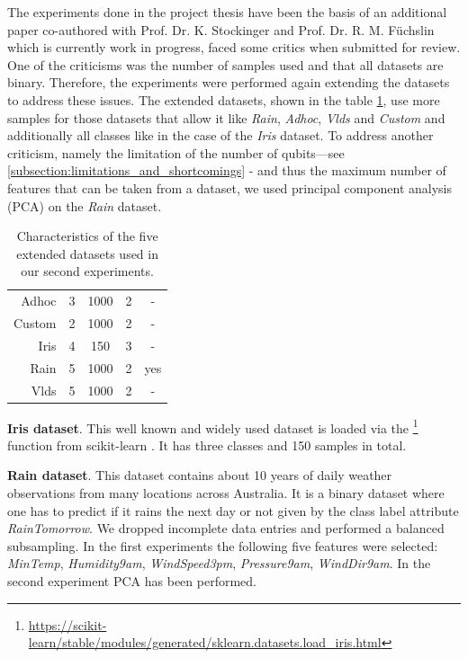 The experiments done in the project thesis have been the basis of an additional paper co-authored with Prof. Dr. K. Stockinger and Prof. Dr. R. M. Füchslin which is currently work in progress, faced some critics when submitted for review. 
One of the criticisms was the number of samples used and that all datasets are binary. Therefore, the experiments were performed again extending the datasets to address these issues. The extended datasets, shown in the table \ref{table:qnn_extended_datasets}, use more samples for those datasets that allow it like \textit{Rain}, \textit{Adhoc}, \textit{Vlds} and \textit{Custom} and additionally all classes like in the case of the \textit{Iris} dataset. To address another criticism, namely the limitation of the number of qubits—see \ref{subsection:limitations_and_shortcomings} - and thus the maximum number of features that can be taken from a dataset, we used principal component analysis (PCA) on the \textit{Rain} dataset.

\begin{table}[!h]
	\centering
	\begin{tabular}{rcccc}
		\hline 
		\thead{\textbf{Dataset}} & \thead{\textbf{\#Features}} & \thead{\textbf{\#Records}} & \thead{\textbf{\#Classes}} & \thead{\textbf{PCA}}\tablefootnote{Principal component analysis (PCA) has been performed with this dataset} \\
		\hline 
		Adhoc   & 3         & 1000      & 2          & -        \\
		Custom  & 2         & 1000      & 2          & -        \\
		Iris    & 4         & 150       & 3          & -        \\
		Rain    & 5         & 1000      & 2          & yes      \\
		Vlds    & 5         & 1000      & 2          & -        \\
		\hline
	\end{tabular}
	\caption{Characteristics of the five extended datasets used in our second experiments.}
	\label{table:qnn_extended_datasets}
\end{table}

\textbf{Iris dataset}. This well known and widely used dataset is loaded via the \footnote{\url{https://scikit-learn/stable/modules/generated/sklearn.datasets.load_iris.html}} function from scikit-learn \cite{scikit-learn,SklearnDatasetsLoad}. It has three classes and 150 samples in total.

\textbf{Rain dataset}. This dataset contains about 10 years of daily weather observations from many locations across Australia. It is a binary dataset where one has to predict if it rains the next day or not given by the class label attribute \textit{RainTomorrow}. We dropped incomplete data entries and performed a balanced subsampling. In the first experiments  the following five features were selected: \textit{MinTemp}, \textit{Humidity9am}, \textit{WindSpeed3pm}, \textit{Pressure9am}, \textit{WindDir9am}. In the second experiment PCA has been performed. 

